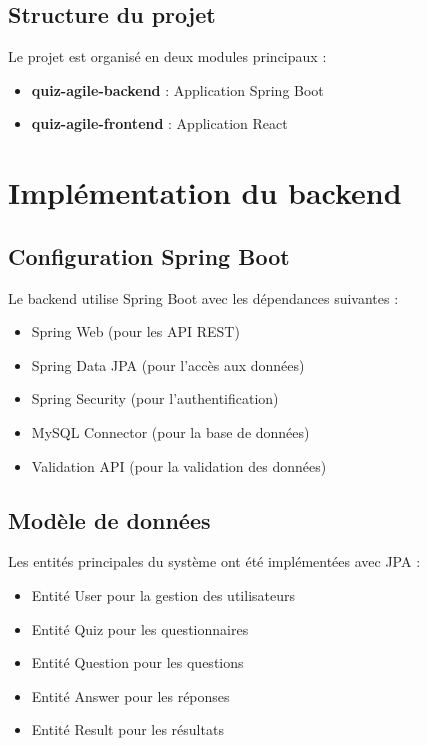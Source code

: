\documentclass[12pt,a4paper]{report}
\begin{document}
\subsection{Structure du projet}

Le projet est organisé en deux modules principaux :

\begin{itemize}
    \item \textbf{quiz-agile-backend} : Application Spring Boot
    \item \textbf{quiz-agile-frontend} : Application React
\end{itemize}

\section{Implémentation du backend}

\subsection{Configuration Spring Boot}

Le backend utilise Spring Boot avec les dépendances suivantes :

\begin{itemize}
    \item Spring Web (pour les API REST)
    \item Spring Data JPA (pour l'accès aux données)
    \item Spring Security (pour l'authentification)
    \item MySQL Connector (pour la base de données)
    \item Validation API (pour la validation des données)
\end{itemize}

\subsection{Modèle de données}

Les entités principales du système ont été implémentées avec JPA :

\begin{itemize}
    \item Entité User pour la gestion des utilisateurs
    \item Entité Quiz pour les questionnaires
    \item Entité Question pour les questions
    \item Entité Answer pour les réponses
    \item Entité Result pour les résultats
\end{itemize}
\end{document}
